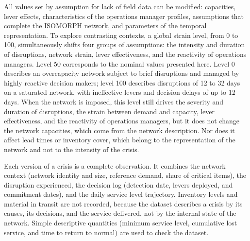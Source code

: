 All values set by assumption for lack of field data can be modified: capacities, lever effects, characteristics of the operations manager profiles, assumptions that complete the ISOMORPH network, and parameters of the temporal representation. To explore contrasting contexts, a global strain level, from 0 to 100, simultaneously shifts four groups of assumptions: the intensity and duration of disruptions, network strain, lever effectiveness, and the reactivity of operations managers. Level 50 corresponds to the nominal values presented here. Level 0 describes an overcapacity network subject to brief disruptions and managed by highly reactive decision makers; level 100 describes disruptions of 12 to 32 days on a saturated network, with ineffective levers and decision delays of up to 12 days. When the network is imposed, this level still drives the severity and duration of disruptions, the strain between demand and capacity, lever effectiveness, and the reactivity of operations managers, but it does not change the network capacities, which come from the network description. Nor does it affect lead times or inventory cover, which belong to the representation of the network and not to the intensity of the crisis.

Each version of a crisis is a complete observation. It combines the network context (network identity and size, reference demand, share of critical items), the disruption experienced, the decision log (detection date, levers deployed, and commitment dates), and the daily service level trajectory. Inventory levels and material in transit are not recorded, because the dataset describes a crisis by its causes, its decisions, and the service delivered, not by the internal state of the network. Simple descriptive quantities (minimum service level, cumulative lost service, and time to return to normal) are used to check the dataset.
